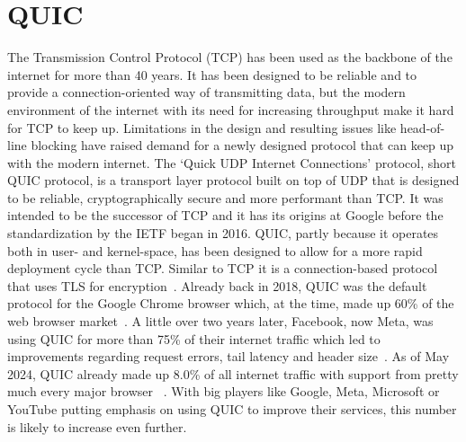 \section{QUIC}\label{sec:quic_bg}
The Transmission Control Protocol (TCP) has been used as the backbone
of the internet for more than 40 years.
It has been designed to be reliable and to provide a connection-oriented
way of transmitting data, but the modern environment of the internet with
its need for increasing throughput make it hard for TCP to keep up.
Limitations in the design and resulting issues like head-of-line blocking
have raised demand for a newly designed protocol that can keep up with the
modern internet. %
The `Quick UDP Internet Connections' protocol, short QUIC protocol, is a 
transport layer protocol built on top of UDP that is designed to be reliable, 
cryptographically secure and more performant than TCP\@.
It was intended to be the successor of TCP and it has its origins at Google before 
the standardization by the IETF began in 2016.
QUIC, partly because it operates both in user- and kernel-space, has been designed to allow for a 
more rapid deployment cycle than TCP\@.
Similar to TCP it is a connection-based protocol that uses TLS for encryption~\parencite{quic-explained}.
Already back in 2018, QUIC was the default protocol for the Google Chrome browser which,
at the time, made up 60\% of the web browser market~\parencite{google-quic-usage}.
A little over two years later, Facebook, now Meta, was using QUIC for more than 75\% of 
their internet traffic which led to improvements regarding
request errors, tail latency and header size~\parencite{facebook-quic-usage}.
As of May 2024, QUIC already made up 8.0\% of all internet traffic
with support from pretty much every major browser
~\parencite{internet-quic-usage, article-quic-usage}.
With big players like Google, Meta, Microsoft or YouTube putting emphasis on
using QUIC to improve their services, this number is likely to increase even further.

